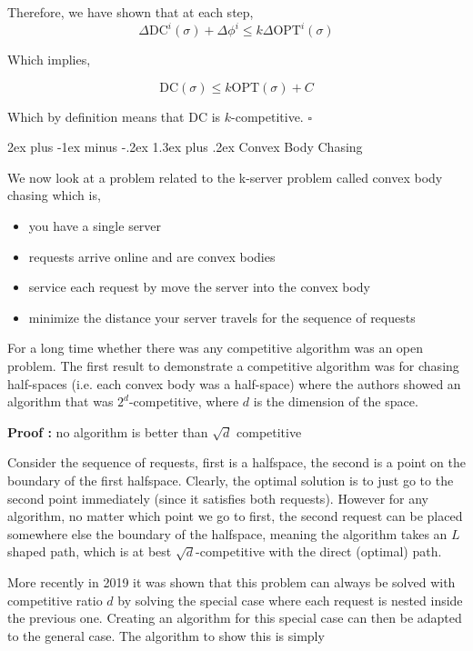 \documentclass[11pt]{article}
\makeatletter
\renewcommand{\section}{\@startsection{section}{1}{0mm}%
                                 {2ex plus -1ex minus -.2ex}%
                                 {1.3ex plus .2ex}%
                                 {\normalfont\Large\bfseries}}%
\newcommand{\DC}{\text{DC}}
\newcommand{\OPT}{\text{OPT}}
\makeatother
\begin{document}
Therefore, we have shown that at each step, 
$$
\Delta\DC^i(\sigma) + \Delta\phi^{i} \leq k \Delta\OPT^i(\sigma)
$$

Which implies, 

$$
\DC(\sigma) \leq k \OPT(\sigma) + C
$$

Which by definition means that DC is $k$-competitive. $\square$


\section{Convex Body Chasing}

We now look at a problem related to the k-server problem called convex body chasing which is,

\begin{itemize}
		\item you have a single server
		\item requests arrive online and are convex bodies
		\item service each request by move the server into the convex body
		\item minimize the distance your server travels for the sequence of requests
\end{itemize}

For a long time whether there was any competitive algorithm was an open problem. The first 
result to demonstrate a competitive algorithm was for chasing half-spaces (i.e. each convex body was a 
half-space) where the authors showed an algorithm that was $2^d$-competitive, where $d$ is the dimension 
of the space.  

\textbf{Proof : } no algorithm is better than $\sqrt{d}$ competitive

Consider the sequence of requests, first is a halfspace, the second is a point on the boundary 
of the first halfspace. Clearly, the optimal solution is to just go to the second point immediately 
(since it satisfies both requests). However for any algorithm, no matter which point we go to 
first, the second request can be placed somewhere else the boundary of the halfspace, meaning the algorithm 
takes an $L$ shaped path, which is at best $\sqrt{d}$-competitive with the direct (optimal) path.


More recently in 2019 it was shown that this problem can always be solved with competitive ratio
$d$ by solving the special case where each request is nested inside the previous one. Creating an algorithm 
for this special case can then be adapted to the general case. The algorithm to show this is simply
\end{document}
